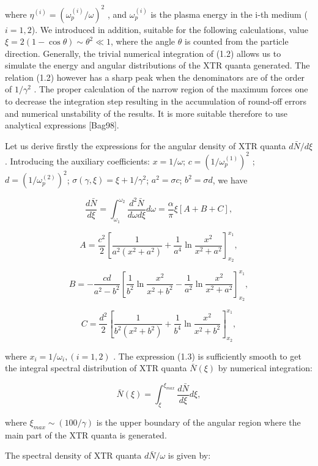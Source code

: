 where $\eta^{(i)} = (\omega_p^{(i)}/\omega)^2$ , and  $\omega_p^{(i)}$  
is the plasma energy in  the i-th medium  ($i = 1,2$). We introduced in 
addition, suitable for the following calculations, value 
$\xi = 2(1 - \cos\theta) \sim \theta^2 \ll 1$, where the angle $\theta$   
is counted  from the particle direction. Generally, the trivial numerical 
integration of (1.2) allows us to simulate the energy and angular distributions 
of the XTR quanta generated. The relation (1.2) however has a sharp peak when 
the denominators are of the order of $1/\gamma^2$  . The proper calculation 
of the narrow region of the maximum  forces one to decrease the integration 
step resulting in the accumulation of  round-off errors and numerical 
unstability of the results. It is more suitable therefore to use 
analytical expressions [Bag98].

Let us derive firstly the expressions for the angular density of XTR 
quanta $d\bar{N}/d\xi$ . Introducing the auxiliary coefficients: 
$x = 1/\omega$; $c = (1/\omega_p^{(1)})^2$ ; $d = (1/\omega_p^{(2)})^2$; 
$\sigma(\gamma,\xi) = \xi + 1/\gamma^2$; 
$a^2 = \sigma c$; $b^2 = \sigma d$, we have

\begin{equation}
\frac{d\bar{N}}{d\xi} = 
\int_{\omega_1}^{\omega_2}\frac{d^2\bar{N}}{d\omega d\xi}d\omega =
\frac{\alpha}{\pi}\xi\left[A + B + C\right] ,
\end{equation}

\[
A = \frac{c^2}{2}\left[\frac{1}{a^2(x^2 + a^2)} + 
\frac{1}{a^4}\ln\frac{x^2}{x^2 + a^2}\right]_{x_2}^{x_1} ,
\]

\[
B = -\frac{cd}{a^2 - b^2}\left[\frac{1}{b^2}\ln\frac{x^2}{x^2 + b^2} -
\frac{1}{a^2}\ln\frac{x^2}{x^2 + a^2}\right]_{x_2}^{x_1} ,
\]

\[
C = \frac{d^2}{2}\left[\frac{1}{b^2(x^2 + b^2)} + 
\frac{1}{b^4}\ln\frac{x^2}{x^2 + b^2}\right]_{x_2}^{x_1} ,
\]

where $x_i = 1/\omega_i,  (i = 1,2)$ .   The expression (1.3)  is sufficiently 
smooth to get the integral spectral distribution of  XTR quanta $\bar{N}(\xi)$ 
by  numerical integration:

\[
\bar{N}(\xi) = \int_{\xi}^{\xi_{max}}\frac{d\bar{N}}{d\xi}d\xi  ,
\]

where  $\xi_{max} \sim (100/\gamma)$  is the upper boundary of the 
angular region where the main part of the XTR quanta is generated.     

The spectral density of XTR quanta $d\bar{N}/\omega$ is given by:


